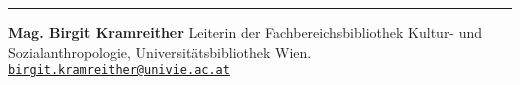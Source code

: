 \begin{center}\rule{0.5\linewidth}{0.5pt}\end{center}

\textbf{Mag. Birgit Kramreither} Leiterin der Fachbereichsbibliothek
Kultur- und Sozialanthropologie, Universitätsbibliothek Wien.
\href{mailto:birgit.kramreither@univie.ac.at}{\nolinkurl{birgit.kramreither@univie.ac.at}}
